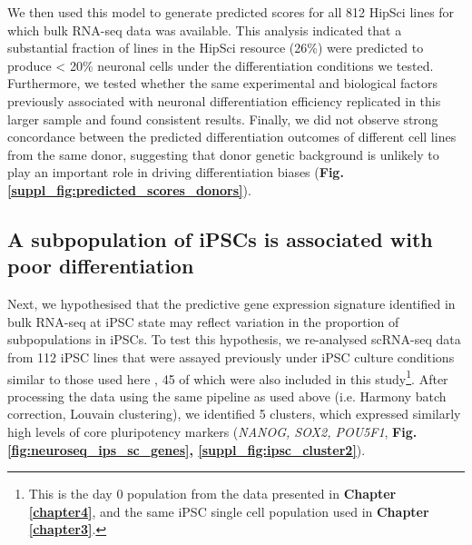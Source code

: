 We then used this model to generate predicted scores for all 812 HipSci lines for which bulk RNA-seq data was available.
This analysis indicated that a substantial fraction of lines in the HipSci resource (26\%) were predicted to produce < 20\% neuronal cells under the differentiation conditions we tested.
Furthermore, we tested whether the same experimental and biological factors previously associated with neuronal differentiation efficiency replicated in this larger sample and found consistent results.
Finally, we did not observe strong concordance between the predicted differentiation outcomes of different cell lines from the same donor, suggesting that donor genetic background is unlikely to play an important role in driving differentiation biases (\textbf{Fig. \ref{suppl_fig:predicted_scores_donors}}).

\newpage

\subsection{A subpopulation of iPSCs is associated with poor differentiation}

Next, we hypothesised that the predictive gene expression signature identified in bulk RNA-seq at iPSC state may reflect variation in the proportion of subpopulations in iPSCs. 
To test this hypothesis, we re-analysed scRNA-seq data from 112 iPSC lines that were assayed previously under iPSC culture conditions similar to those used here \cite{cuomo2020single}, 45 of which were also included in this study\footnote{This is the day 0 population from the data presented in \textbf{Chapter \ref{chapter4}}, and the same iPSC single cell population used in \textbf{Chapter \ref{chapter3}}.}. 
After processing the data using the same pipeline as used above (i.e. Harmony batch correction, Louvain clustering),
we identified 5 clusters, which expressed similarly high levels of core pluripotency markers (\textit{NANOG, SOX2, POU5F1}, \textbf{Fig. \ref{fig:neuroseq_ips_sc_genes}, \ref{suppl_fig:ipsc_cluster2}}). \\

